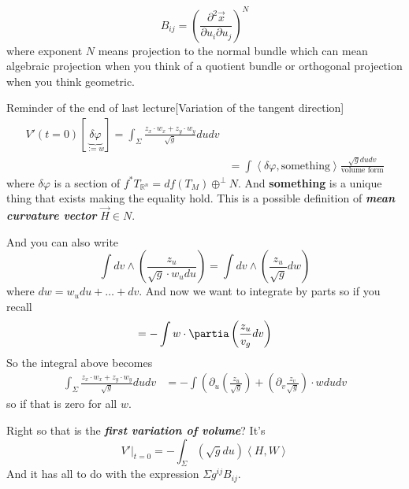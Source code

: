\begin{claim}\leavevmode
\[B_{ij}=\left(\frac{\partial^2 \vec{x}}{\partial u_i\partial u_j}\right)^N \]
where exponent \(N\) means projection to the normal bundle which can mean algebraic projection when you think of a quotient bundle or orthogonal projection when you think geometric.
\end{claim}

\begin{thing6}{Reminder of the end of last lecture}[Variation of the tangent direction]\leavevmode
	\begin{align*}V'(t=0)[\underbrace{\delta \varphi}_{:=w}]= \int_{\Sigma}\frac{z_x\cdot w_x+z_y\cdot w_y}{\sqrt{g} }dudv\\
		&=\int \left<\delta \varphi,\text{something} \right>\frac{\sqrt{g} dudv}{\text{volume form} }
	\end{align*}
where \(\delta \varphi\) is a section of \(f^* T_{\mathbb{R}^n}=df(T_M) \oplus^\perp N\). And \textbf{something} is a unique thing that exists making the equality hold. This is a possible definition of \textit{\textbf{mean curvature vector}} \(\vec{H} \in N\).

And you can also write
\[\int dv \wedge \left(\frac{z_u}{\sqrt{g} \cdot w_u du}\right) = \int dv \wedge \left(\frac{z_u}{\sqrt{g} }dw\right) \]
where \(dw=w_u du+\ldots+dv\). And now we want to integrate by parts so if you recall
\[=-\int w \cdot \partia\left(\frac{z_u}{v_g}dv\right) \]
So the integral above becomes
\begin{align*}
\int_{\Sigma}\frac{z_x\cdot w_x+z_y\cdot w_y}{\sqrt{g} }dudv&=-\int \left(\partial_u \left(\frac{z_u}{\sqrt{g} }\right)+\left(\partial_v \frac{z_v}{\sqrt{g} } \right) \cdot w du dv
\end{align*}
so if that is zero for all \(w\).
\end{thing6}

Right so that is the \textit{\textbf{first variation of volume}}? It's
\[V'|_{t=0}=-\int_\Sigma(\sqrt{g} du) \left<H,W\right>\]
And it has all to do with the expression \(\Sigma g^{ij}B_{ij}\).




\clearpage

